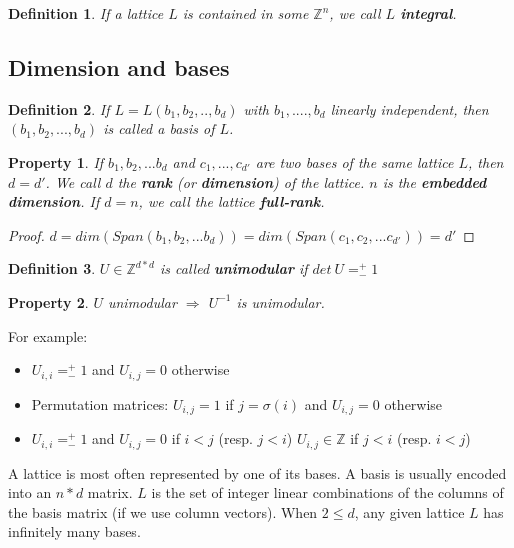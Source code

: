 \documentclass[a4paper,10pt]{article}
\newtheorem{definition}{Definition}
\newtheorem{proposition}{Property}
\begin{document}
\begin{definition}
If a lattice $L$ is contained in some $\mathbb{Z}^n$, we call $L$ \textbf{integral}.
\end{definition}

\subsection{Dimension and bases}

\begin{definition}
If $L=L(b_1,b_2,..,b_d)$ with $b_1,....,b_d$ linearly independent, then $(b_1,b_2,...,b_d)$ is called a basis of $L$.
\end{definition}

\begin{proposition}
If $b_1,b_2,...b_d$ and $c_1,...,c_{d'}$ are two bases of the same lattice $L$, then $d=d'$. We call $d$ the \textbf{rank} (or \textbf{dimension}) of the lattice. $n$ is the \textbf{embedded dimension}. If $d=n$, we call the lattice \textbf{full-rank}.
\end{proposition}

\begin{proof}
$d=dim(Span(b_1,b_2,...b_d))=dim(Span(c_1,c_2,...c_{d'}))=d'$
\end{proof}

\begin{definition}
$U \in \mathbb{Z}^{d*d}$ is called \textbf{unimodular} if $det \ U = ^+_-1$
\end{definition}

\begin{proposition}
$U$ unimodular $\Rightarrow$ $U^{-1}$ is unimodular.
\end{proposition}

For example:
\begin{itemize}
\item $U_{i,i}=^+_- 1$ and $U_{i,j}=0$ otherwise
\item Permutation matrices: $U_{i,j}=1$ if $j=\sigma(i)$ and $U_{i,j}=0$ otherwise
\item $U_{i,i}=^+_- 1$ and $U_{i,j}=0$ if $i < j$ (resp. $j<i$)  $U_{i,j}\in \mathbb{Z}$ if $j < i$ (resp. $i<j$)
\end{itemize}

A lattice is most often represented by one of its bases.
A basis is usually encoded into an $n*d$ matrix.
$L$ is the set of integer linear combinations of the columns of the basis matrix (if we use column vectors).
When $2 \leq d$, any given lattice $L$ has infinitely many bases.
\end{document}

